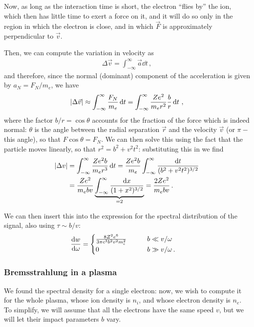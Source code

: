 \documentclass[main.tex]{subfiles}
\begin{document}
Now, as long as the interaction time is short, the electron ``flies by'' the ion, which then has little time to exert a force on it, and it will do so only in the region in which the electron is close, and in which \(\vec{F}\) is approximately perpendicular to \(\vec{v}\). 

Then, we can compute the variation in velocity as 
%
\begin{align}
\Delta \vec{v} = \int_{- \infty }^{\infty} \vec{a} \dd{t}
\,,
\end{align}
%
and therefore, since the normal (dominant) component of the acceleration is given by \(a_N = F_N / m_e \), we have 
%
\begin{align}
\abs{\Delta \vec{v}} \approx \int_{- \infty }^{\infty} \frac{F_N}{m_e} \dd{t}
= \int_{- \infty }^{\infty}
\frac{Ze^2}{m_e r^2} \frac{b}{r} \dd{t}
\,,
\end{align}
%
where the factor \(b/r = \cos \theta \) accounts for the fraction of the force which is indeed normal: \(\theta \) is the angle between the radial separation \(\vec{r}\) and the velocity \(\vec{v}\) (or \(\pi - \) this angle), so that \(F \cos \theta = F_N\). 
We can then solve this using the fact that the particle moves linearly, so that \(r^2= b^2 + v^2 t^2\): substituting this in we find 
%
\begin{align}
\abs{\Delta v} &= \int _{- \infty }^{\infty} \frac{Ze^2b}{m_e r^3} \dd{t}
= \frac{Z e^2 b}{m_e} \int  _{- \infty }^{\infty} \frac{ \dd{t}}{(b^2 + v^2 t^2)^{3/2}}  \\
&= \frac{Ze^2}{m_e bv } \underbrace{\int _{- \infty }^{\infty} \frac{ \dd{x}}{(1 + x^2)^{3/2}}}_{= 2} = \frac{2 Z e^2}{m_e bv}
\,.
\end{align}

We can then insert this into the expression for the spectral distribution of the signal, also using \(\tau \sim b/v\): 
%
\begin{align}
\dv{w}{\omega } 
&= 
\begin{cases}
    \frac{8 Z^2e^6}{3 \pi c^3 b^2 v^2 m_e^2 }  &\qquad b \ll v/\omega   \\
    0 &\qquad b \gg v/\omega \,.
\end{cases}
\end{align}

\subsubsection{Bremsstrahlung in a plasma}

We found the spectral density for a single electron: now, we wish to compute it for the whole plasma, whose ion density is \(n_i\), and whose electron density is \(n_e\).
To simplify, we will assume that all the electrons have the same speed \(v\), but we will let their impact parameters \(b\) vary.
\end{document}
